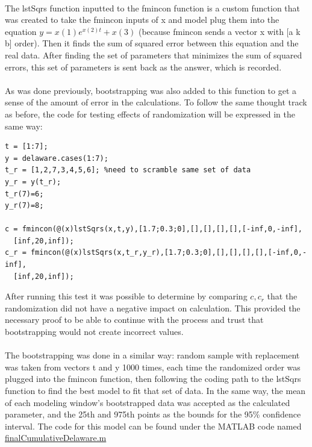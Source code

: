 \documentclass[12pt]{article}
\begin{document}
\paragraph{} The lstSqrs function inputted to the fmincon function is a custom function that was created to take the fmincon inputs of x and model plug them into the equation $y = x(1)e ^ {x(2)t} +x(3)$ (because fmincon sends a vector x with [a k b] order). Then it finds the sum of squared error between this equation and the real data. After finding the set of parameters that minimizes the sum of squared errors, this set of parameters is sent back as the answer, which is recorded.
\paragraph{} As was done previously, bootstrapping was also added to this function to get a sense of the amount of error in the calculations. To follow the same thought track as before, the code for testing effects of randomization will be expressed in the same way:
\begin{lstlisting}
t = [1:7];
y = delaware.cases(1:7);
t_r = [1,2,7,3,4,5,6]; %need to scramble same set of data
y_r = y(t_r);
t_r(7)=6;
y_r(7)=8;

c = fmincon(@(x)lstSqrs(x,t,y),[1.7;0.3;0],[],[],[],[],[-inf,0,-inf],
  [inf,20,inf]);
c_r = fmincon(@(x)lstSqrs(x,t_r,y_r),[1.7;0.3;0],[],[],[],[],[-inf,0,-inf],
  [inf,20,inf]);
\end{lstlisting}
After running this test it was possible to determine by comparing $c,c_r$ that the randomization did not have a negative impact on calculation. This provided the necessary proof to be able to continue with the process and trust that bootstrapping would not create incorrect values.
\paragraph{} The bootstrapping was done in a similar way: random sample with replacement was taken from vectors t and y 1000 times, each time the randomized order was plugged into the fmincon function, then following the coding path to the lstSqrs function to find the best model to fit that set of data. In the same way, the mean of each modeling window's bootstrapped data was accepted as the calculated parameter, and the 25th and 975th points as the bounds for the 95\% confidence interval. The code for this model can be found under the MATLAB code named \href{https://github.com/tatabas/delaware-covid-analysis}{finalCumulativeDelaware.m}
\end{document}
